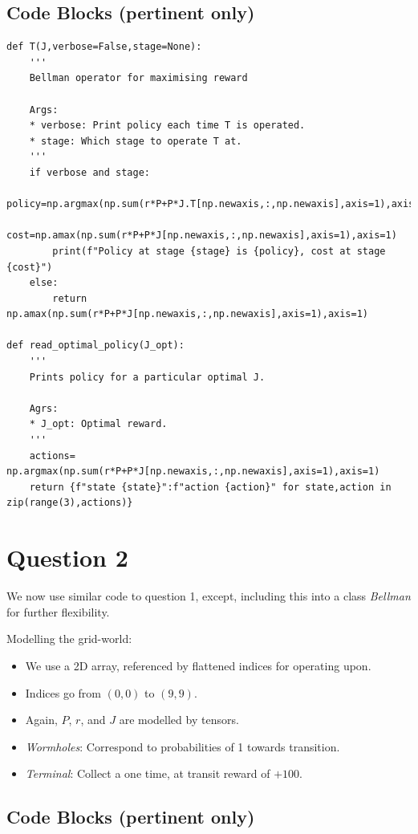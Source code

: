 \subsection {Code Blocks (pertinent only)}
\begin{lstlisting}
def T(J,verbose=False,stage=None):
    '''
    Bellman operator for maximising reward

    Args:
    * verbose: Print policy each time T is operated.
    * stage: Which stage to operate T at.
    '''
    if verbose and stage:
        policy=np.argmax(np.sum(r*P+P*J.T[np.newaxis,:,np.newaxis],axis=1),axis=1)
        cost=np.amax(np.sum(r*P+P*J[np.newaxis,:,np.newaxis],axis=1),axis=1)
        print(f"Policy at stage {stage} is {policy}, cost at stage {cost}")
    else:
        return np.amax(np.sum(r*P+P*J[np.newaxis,:,np.newaxis],axis=1),axis=1)

def read_optimal_policy(J_opt):
    '''
    Prints policy for a particular optimal J.

    Agrs:
    * J_opt: Optimal reward.
    '''
    actions= np.argmax(np.sum(r*P+P*J[np.newaxis,:,np.newaxis],axis=1),axis=1)
    return {f"state {state}":f"action {action}" for state,action in zip(range(3),actions)}
\end{lstlisting}
\bigskip

\section{Question 2}

We now use similar code to question 1, except, including this into a class \textit{Bellman} for further flexibility.

Modelling the grid-world:
\begin{itemize}
\item We use a 2D array, referenced by flattened indices for operating upon.
\item Indices go from $(0,0)$ to $(9,9)$. 
\item Again, $P$, $r$, and $J$ are modelled by tensors.
\item \textit{Wormholes}: Correspond to probabilities of 1 towards transition.
\item \textit{Terminal}: Collect a one time, at transit reward of $+100$. 
\end{itemize}

\subsection{Code Blocks (pertinent only)}

